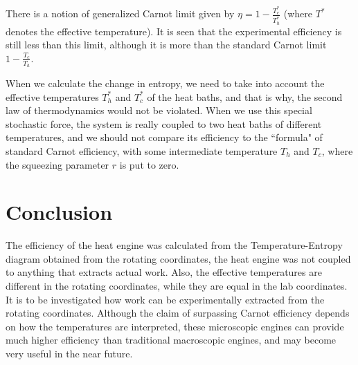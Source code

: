 \documentclass[12pt, twoside]{article}
\begin{document}
There is a notion of generalized Carnot limit given by $\eta = 1 - \frac{T^*_{c}}{T^*_{h}}$ (where $T^*$ denotes the effective temperature). It is seen that the experimental efficiency is still less than this limit, although it is more than the standard Carnot limit $1 - \frac{T_{c}}{T_{h}}$. 

When we calculate the change in entropy, we need to take into account the effective temperatures  ${T^*_{h}}$ and ${T^*_{c}}$ of the heat baths, and that is why, the second law of thermodynamics would not be violated. When we use this special stochastic force, the system is really coupled to two heat baths of different temperatures, and we should not compare its efficiency to the ``formula" of standard Carnot efficiency, with some intermediate temperature $T_{h}$ and $T_{c}$, where the squeezing parameter $r$ is put to zero.

\section{Conclusion}
The efficiency of the heat engine was calculated from the Temperature-Entropy diagram obtained from the rotating coordinates, the heat engine was not coupled to anything that extracts actual work. Also, the effective temperatures are different in the rotating coordinates, while they are equal in the lab coordinates. It is to be investigated how work can be experimentally extracted from the rotating coordinates. Although the claim of surpassing Carnot efficiency depends on how the temperatures are interpreted, these microscopic engines can provide much higher efficiency than traditional macroscopic engines, and may become very useful in the near future.



\end{document}
